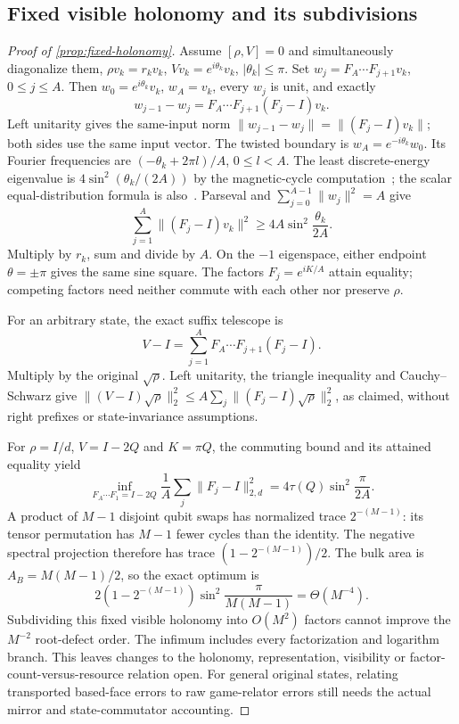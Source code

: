 \subsection{Fixed visible holonomy and its subdivisions}\label{app:fixed-holonomy}
\begin{proof}[Proof of \cref{prop:fixed-holonomy}]
Assume $[\rho,V]=0$ and simultaneously diagonalize them, $\rho v_k=r_kv_k$, $Vv_k=e^{i\theta_k}v_k$, $|\theta_k|\le\pi$. Set $w_j=F_A\cdots F_{j+1}v_k$, $0\le j\le A$. Then $w_0=e^{i\theta_k}v_k$, $w_A=v_k$, every $w_j$ is unit, and exactly
\[
 w_{j-1}-w_j=F_A\cdots F_{j+1}(F_j-I)v_k.
\]
Left unitarity gives the same-input norm $\|w_{j-1}-w_j\|=\|(F_j-I)v_k\|$; both sides use the same input vector. The twisted boundary is $w_A=e^{-i\theta_k}w_0$. Its Fourier frequencies are $(-\theta_k+2\pi l)/A$, $0\le l<A$. The least discrete-energy eigenvalue is $4\sin^2(\theta_k/(2A))$ by the magnetic-cycle computation~\cite[Lemma~2.9]{CTT11}; the scalar equal-distribution formula is also~\cite[Proposition~4.6(b)]{BGKLM20}. Parseval and $\sum_{j=0}^{A-1}\|w_j\|^2=A$ give
\[
 \sum_{j=1}^A\|(F_j-I)v_k\|^2\ge4A\sin^2\frac{\theta_k}{2A}.
\]
Multiply by $r_k$, sum and divide by $A$. On the $-1$ eigenspace, either endpoint $\theta=\pm\pi$ gives the same sine square. The factors $F_j=e^{iK/A}$ attain equality; competing factors need neither commute with each other nor preserve $\rho$.

For an arbitrary state, the exact suffix telescope is
\[
 V-I=\sum_{j=1}^AF_A\cdots F_{j+1}(F_j-I).
\]
Multiply by the original $\sqrt\rho$. Left unitarity, the triangle inequality and Cauchy--Schwarz give $\|(V-I)\sqrt\rho\|_2^2\le A\sum_j\|(F_j-I)\sqrt\rho\|_2^2$, as claimed, without right prefixes or state-invariance assumptions.

For $\rho=I/d$, $V=I-2Q$ and $K=\pi Q$, the commuting bound and its attained equality yield
\[
 \inf_{F_A\cdots F_1=I-2Q}\frac1A\sum_j\|F_j-I\|_{2,d}^2
 =4\tau(Q)\sin^2\frac\pi{2A}.
\]
A product of $M-1$ disjoint qubit swaps has normalized trace $2^{-(M-1)}$: its tensor permutation has $M-1$ fewer cycles than the identity. The negative spectral projection therefore has trace $(1-2^{-(M-1)})/2$. The bulk area is $A_B=M(M-1)/2$, so the exact optimum is
\[
 2(1-2^{-(M-1)})\sin^2\frac\pi{M(M-1)}=\Theta(M^{-4}).
\]
Subdividing this fixed visible holonomy into $O(M^2)$ factors cannot improve the $M^{-2}$ root-defect order. The infimum includes every factorization and logarithm branch. This leaves changes to the holonomy, representation, visibility or factor-count-versus-resource relation open. For general original states, relating transported based-face errors to raw game-relator errors still needs the actual mirror and state-commutator accounting.
\end{proof}
